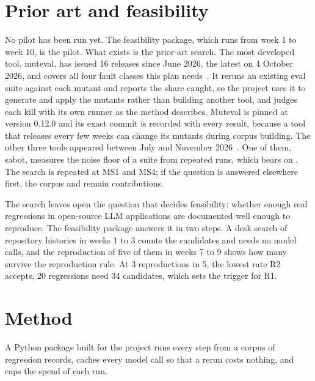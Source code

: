 \documentclass[11pt]{article}
\begin{document}
\section{Prior art and feasibility}

No pilot has been run yet. The feasibility package, which runs from week 1 to week 10, is the pilot. What exists is the prior-art search. The most developed tool, muteval, has issued 16 releases since June 2026, the latest on 4 October 2026, and covers all four fault classes this plan needs~\cite{muteval}. It reruns an existing eval suite against each mutant and reports the share caught, so the project uses it to generate and apply the mutants rather than building another tool, and judges each kill with its own runner as the method describes. Muteval is pinned at version 0.12.0 and its exact commit is recorded with every result, because a tool that releases every few weeks can change its mutants during corpus building. The other three tools appeared between July and November 2026~\cite{sabot,litmus,clastogen}. One of them, sabot, measures the noise floor of a suite from repeated runs, which bears on . The search is repeated at MS1 and MS4; if the question is answered elsewhere first, the corpus and  remain contributions.

The search leaves open the question that decides feasibility: whether enough real regressions in open-source LLM applications are documented well enough to reproduce. The feasibility package answers it in two steps. A desk search of repository histories in weeks 1 to 3 counts the candidates and needs no model calls, and the reproduction of five of them in weeks 7 to 9 shows how many survive the reproduction rule. At 3 reproductions in 5, the lowest rate R2 accepts, 20 regressions need 34 candidates, which sets the trigger for R1.

\section{Method}

A Python package built for the project runs every step from a corpus of regression records, caches every model call so that a rerun costs nothing, and caps the spend of each run.
\end{document}
